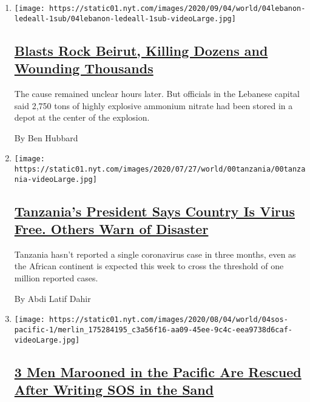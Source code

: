 \begin{enumerate}
\def\labelenumi{\arabic{enumi}.}
\item
  \texttt{[image: https://static01.nyt.com/images/2020/09/04/world/04lebanon-ledeall-1sub/04lebanon-ledeall-1sub-videoLarge.jpg]}

  \hypertarget{blasts-rock-beirut-killing-dozens-and-wounding-thousands}{%
  \subsection{\texorpdfstring{\href{/2020/08/04/world/middleeast/lebanon-explosion.html}{Blasts
  Rock Beirut, Killing Dozens and Wounding
  Thousands}}{Blasts Rock Beirut, Killing Dozens and Wounding Thousands}}\label{blasts-rock-beirut-killing-dozens-and-wounding-thousands}}

  The cause remained unclear hours later. But officials in the Lebanese
  capital said 2,750 tons of highly explosive ammonium nitrate had been
  stored in a depot at the center of the explosion.

  By Ben Hubbard
\item
  \texttt{[image: https://static01.nyt.com/images/2020/07/27/world/00tanzania/00tanzania-videoLarge.jpg]}

  \hypertarget{tanzanias-president-says-country-is-virus-free-others-warn-of-disaster}{%
  \subsection{\texorpdfstring{\href{/2020/08/04/world/africa/tanzanias-coronavirus-president.html}{Tanzania's
  President Says Country Is Virus Free. Others Warn of
  Disaster}}{Tanzania's President Says Country Is Virus Free. Others Warn of Disaster}}\label{tanzanias-president-says-country-is-virus-free-others-warn-of-disaster}}

  Tanzania hasn't reported a single coronavirus case in three months,
  even as the African continent is expected this week to cross the
  threshold of one million reported cases.

  By Abdi Latif Dahir
\item
  \texttt{[image: https://static01.nyt.com/images/2020/08/04/world/04sos-pacific-1/merlin\_175284195\_c3a56f16-aa09-45ee-9c4c-eea9738d6caf-videoLarge.jpg]}

  \hypertarget{3-men-marooned-in-the-pacific-are-rescued-after-writing-sos-in-the-sand}{%
  \subsection{\texorpdfstring{\href{/2020/08/04/world/australia/sos-pacific-island.html}{3
  Men Marooned in the Pacific Are Rescued After Writing SOS in the
  Sand}}{3 Men Marooned in the Pacific Are Rescued After Writing SOS in the Sand}}\label{3-men-marooned-in-the-pacific-are-rescued-after-writing-sos-in-the-sand}}


\end{enumerate}
